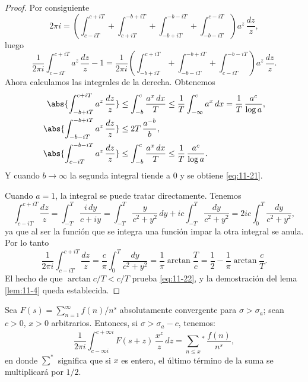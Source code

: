 \documentclass[12pt,a4paper]{book}
\begin{document}
\begin{proof}
        Por consiguiente
        \begin{equation*}
            2\pi i=\left(\int_{c-iT}^{c+iT}+\int_{c+iT}^{-b+iT}+\int_{-b+iT}^{-b-iT}+\int_{-b-iT}^{c-iT}\right)a^{z}\,\frac{dz}{z},
        \end{equation*}
        luego
        \begin{equation*}
            \frac{1}{2\pi i}\int_{c-iT}^{c+iT}a^{z}\,\frac{dz}{z}-1=\frac{1}{2\pi i}\left(\int_{-b+iT}^{c+iT}+\int_{-b-iT}^{-b+iT}+\int_{c-iT}^{-b-iT}\right)a^{z}\,\frac{dz}{z}.
        \end{equation*}
        Ahora calculamos las integrales de la derecha. Obtenemos
        \begin{align*}
            \abs{\int_{-b+iT}^{c+iT}a^{z}\,\frac{dz}{z}}&\leq\int_{-b}^{c}\frac{a^{x}\,dx}{T}\leq\frac{1}{T}\int_{-\infty}^{c}a^{x}\,dx=\frac{1}{T}\,\frac{a^{c}}{\log a},\\
            \abs{\int_{-b-iT}^{-b+iT}a^{z}\,\frac{dz}{z}}&\leq2T\,\frac{a^{-b}}{b},\\
            \abs{\int_{c-iT}^{-b-iT}a^{z}\,\frac{dz}{z}}&\leq\int_{-b}^{c}\frac{a^{x}\,dx}{T}\leq\frac{1}{T}\,\frac{a^{c}}{\log a}.
        \end{align*}
        Y cuando $b\to\infty$ la segunda integral tiende a 0 y se obtiene \eqref{eq:11-21}.

        Cuando $a=1$, la integral se puede tratar directamente. Tenemos
        \begin{equation*}
            \int_{c-iT}^{c+iT}\frac{dz}{z}=\int_{-T}^{T}\frac{i\,dy}{c+iy}=\int_{-T}^{T}\frac{y}{c^{2}+y^{2}}\,dy+ic\int_{-T}^{T}\frac{dy}{c^{2}+y^{2}}=2ic\int_{0}^{T}\frac{dy}{c^{2}+y^{2}},
        \end{equation*}
        ya que al ser la función que se integra una función impar la otra integral se anula.
        Por lo tanto
        \begin{equation*}
            \frac{1}{2\pi i}\int_{c-iT}^{c+iT}\frac{dz}{z}=\frac{c}{\pi}\int_{0}^{T}\frac{dy}{c^{2}+y^{2}}=\frac{1}{\pi}\operatorname{arctan}\frac{T}{c}=\frac{1}{2}-\frac{1}{\pi}\operatorname{arctan}\frac{c}{T}.
        \end{equation*}
        El hecho de que $\operatorname{arctan}c/T<c/T$ prueba \eqref{eq:11-22}, y la
        demostración del lema \ref{lem:11-4} queda establecida.
    \end{proof}

    \begin{teorema}\label{teo:11-18}
        Sea $F(s)=\sum_{n=1}^{\infty}f(n)/n^{s}$ absolutamente convergente para $\sigma>\sigma_{a}$;
        sean $c>0$, $x>0$ arbitrarios. Entonces, si $\sigma>\sigma_{a}-c$, tenemos:
        \begin{equation*}
            \frac{1}{2\pi i}\int_{c-\infty i}^{c+\infty i}F(s+z)\,\frac{x^{z}}{z}\,dz=\sum_{n\leq x}{}^{*}\,\frac{f(n)}{n^{s}},
        \end{equation*}
        en donde $\sum^{*}$ significa que si $x$ es entero, el último término de la suma se
        multiplicará por $1/2$.
    \end{teorema}
\end{document}
